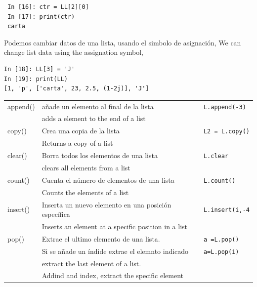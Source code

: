 \begin{center}
\begin{minipage}{0.3\textwidth}
 \begin{verbatim}
 In [16]: ctr = LL[2][0]
 In [17]: print(ctr)
 carta
\end{verbatim}
\end{minipage}
\end{center}
\begin{paracol}{2}
Podemos cambiar datos de una lista, usando el simbolo de asignación,
\switchcolumn
We can change list data using the assignation symbol,
\end{paracol}
\begin{center}
\begin{minipage}{0.5\textwidth}
\begin{verbatim}
In [18]: LL[3] = 'J'
In [19]: print(LL)
[1, 'p', ['carta', 23, 2.5, (1-2j)], 'J']
\end{verbatim}
\end{minipage}
\end{center}

\begin{table}
\centering
    \begin{tabular}{l l l}
    append() & añade un elemento al final de la lista & \texttt{L.append(-3)}\\
    & adds a element to the end of a list & \\
    \hline
    copy() & Crea una copia de la lista & \texttt{L2 = L.copy()}\\
    & Returns a copy of a list & \\
    \hline
     clear() & Borra todos los elementos de una lista & \texttt{L.clear}\\
     &clears all elements from a list&\\
     \hline
     count()& Cuenta el número de elementos de una lista & \texttt{L.count()}\\
     &Counts the elements of a list&\\
     \hline
     insert() & Inserta un nuevo elemento en una posición específica & \texttt{L.insert(i,-4}\\
     &Inserts an element at a specific position in a list &\\
     \hline
     pop() & Extrae el ultimo elemento de una lista.  &\texttt{a =L.pop()}\\
     & Si se añade un índide extrae el elemnto indicado &\texttt{a=L.pop(i)}\\
     & extract the last element of a list. &\\
     &Addind and index, extract the specific element& \\
     \hline
    \end{tabular}
    \label{Tb:listas}
\end{table}


